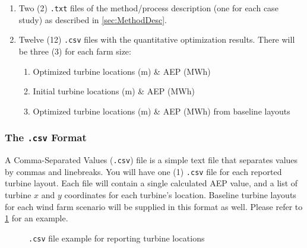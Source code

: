 \documentclass[12pt]{article}
\begin{document}
    \begin{enumerate}
        \item Two (2) \texttt{.txt} files of the method/process description (one for each case study) as described in \cref{sec:MethodDesc}.
        \item Twelve (12) \texttt{.csv} files with the quantitative optimization results. There will be three (3) for each farm size:
        \begin{enumerate}[1)]
            \item Optimized turbine locations (m) \& AEP (MWh)
            \item Initial turbine locations (m) \& AEP (MWh)
            \item Optimized turbine locations (m) \& AEP (MWh) from baseline layouts
        \end{enumerate}
    \end{enumerate}
    
    \subsubsection{The \texttt{.csv} Format}
    \label{Sec:Csv}
    A Comma-Separated Values (\texttt{.csv}) file is a simple text file that separates values by commas and linebreaks. You will have one (1) \texttt{.csv} file for each reported turbine layout. Each file will contain a single calculated AEP value, and a list of turbine $x$ and $y$ coordinates for each turbine's location. Baseline turbine layouts for each wind farm scenario will be supplied in this format as well. Please refer to \cref{code:locations} for an example.
    
    \begin{figure}[H]
    \centering
    \caption{\texttt{.csv} file example for reporting turbine locations}
    \label{code:locations}
    \end{figure}
    
\end{document}
